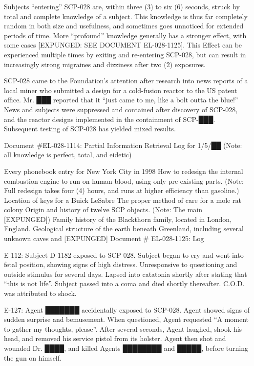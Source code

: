 Subjects “entering” SCP-028 are, within three (3) to six (6) seconds, struck by total and complete knowledge of a subject. This knowledge is thus far completely random in both size and usefulness, and sometimes goes unnoticed for extended periods of time. More “profound” knowledge generally has a stronger effect, with some cases [EXPUNGED: SEE DOCUMENT EL-028-1125]. This Effect can be experienced multiple times by exiting and re-entering SCP-028, but can result in increasingly strong migraines and dizziness after two (2) exposures.

SCP-028 came to the Foundation’s attention after research into news reports of a local miner who submitted a design for a cold-fusion reactor to the US patent office. Mr. ███ reported that it “just came to me, like a bolt outta the blue!” News and subjects were suppressed and contained after discovery of SCP-028, and the reactor designs implemented in the containment of SCP-███. Subsequent testing of SCP-028 has yielded mixed results.

Document \#EL-028-1114: Partial Information Retrieval Log for 1/5/██ (Note: all knowledge is perfect, total, and eidetic)

Every phonebook entry for New York City in 1998
How to redesign the internal combustion engine to run on human blood, using only pre-existing parts. (Note: Full redesign takes four (4) hours, and runs at higher efficiency than gasoline.)
Location of keys for a Buick LeSabre
The proper method of care for a mole rat colony
Origin and history of twelve SCP objects. (Note: The main [EXPUNGED])
Family history of the Blackthorn family, located in London, England.
Geological structure of the earth beneath Greenland, including several unknown caves and [EXPUNGED]
Document \# EL-028-1125: Log

E-112: Subject D-1182 exposed to SCP-028. Subject began to cry and went into fetal position, showing signs of high distress. Unresponsive to questioning and outside stimulus for several days. Lapsed into catatonia shortly after stating that “this is not life”. Subject passed into a coma and died shortly thereafter. C.O.D. was attributed to shock.

E-127: Agent ███████ accidentally exposed to SCP-028. Agent showed signs of sudden surprise and bemusement. When questioned, Agent requested “A moment to gather my thoughts, please”. After several seconds, Agent laughed, shook his head, and removed his service pistol from its holster. Agent then shot and wounded Dr. ████, and killed Agents ████████ and █████, before turning the gun on himself.

